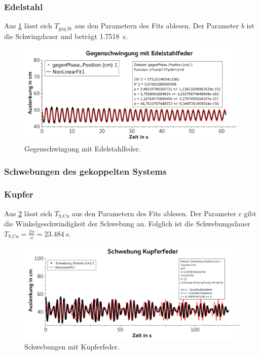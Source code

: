 \documentclass[
	a4paper,
	12pt,
	pagesize,
	ngerman
]{scrartcl}
\begin{document}
	\subsubsection*{Edelstahl}
	Aus \cref{EdelstahlGegenschwingung} lässt sich $T_\text{geg,St}$ aus den Parametern des Fits ablesen. Der Parameter $b$ ist die Schwingdauer und beträgt \SI{1,7518}{s}.
	\begin{figure}[H]
		\includegraphics[width=1\textwidth]{EdelstahlGegenschwingung}
		\centering
		\caption{Gegenschwingung mit Edelstahlfeder.}
		\label{EdelstahlGegenschwingung}
		\centering
	\end{figure}



	\subsubsection{Schwebungen des gekoppelten Systems}

	\subsubsection*{Kupfer}
	Aus \cref{KupferSchwebung} lässt sich $T_\text{S,Cu}$ aus den Parametern des Fits ablesen. Der Parameter $c$ gibt die Winkelgeschwindigkeit der Schwebung an. Folglich ist die Schwebungsdauer $T_\text{S,Cu} = \frac{2\pi}{\omega} = \SI{23,484}{s}$.
	\begin{figure}[H]
		\includegraphics[width=1\textwidth]{KupferSchwebung}
		\centering
		\caption{Schwebungen mit Kupferfeder.}
		\label{KupferSchwebung}
		\centering
	\end{figure}
\end{document}
